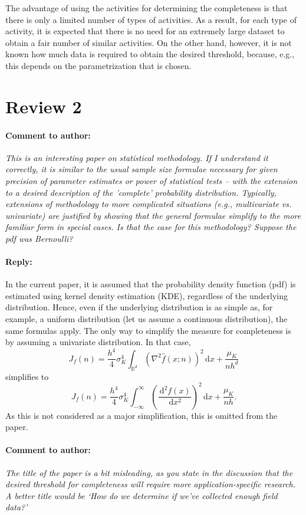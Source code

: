 \documentclass[10pt,final,a4paper,oneside,onecolumn]{article}
\newcommand{\measure}[2]{J_{#1} \left( #2 \right)}
\newcommand*{\ud}{\mathrm{\,d}}
\newcommand{\toauthor}{\paragraph*{Comment to author:} \itshape}
\newcommand{\fromauthor}{\paragraph*{Reply:} \normalfont}
\newcommand{\cstart}{\cbstart\color{red}}
\newcommand{\cend}{\cbend\color{black}}
\begin{document}
\cstart 
The advantage of using the activities for determining the completeness is that there is only a limited number of types of activities. As a result, for each type of activity, it is expected that there is no need for an extremely large dataset to obtain a fair number of similar activities. On the other hand, however, it is not known how much data is required to obtain the desired threshold, because, e.g., this depends on the parametrization that is chosen. 
\cend 

\section*{Review 2}

\toauthor This is an interesting paper on statistical methodology. If I understand it correctly, it is similar to the usual sample size formulae necessary for given precision of parameter estimates or power of statistical tests -- with the extension to a desired description of the 'complete' probability distribution. Typically, extensions of methodology to more complicated situations (e.g., multivariate vs. univariate) are justified by showing that the general formulae simplify to the more familiar form in special cases. Is that the case for this methodology? Suppose the pdf was Bernoulli? 

\fromauthor In the current paper, it is assumed that the probability density function (pdf) is estimated using kernel density estimation (KDE), regardless of the underlying distribution. Hence, even if the underlying distribution is as simple as, for example, a uniform distribution (let us assume a continuous distribution), the same formulas apply. The only way to simplify the measure for completeness is by assuming a univariate distribution. In that case, 
\begin{equation}
	\measure{f}{n} = \frac{h^4}{4} \sigma_K^4 \int_{\mathbb{R}^d} \left( \nabla^2 \hat{f}(x;n) \right)^2 \ud x + \frac{\mu_K}{nh^d}
\end{equation}
simplifies to
\begin{equation}
	\measure{f}{n} = \frac{h^4}{4} \sigma_K^4 \int_{-\infty}^{\infty} \left( \frac{\ud^2 f(x)}{\ud x^2} \right)^2 \ud x + \frac{\mu_K}{nh}.
\end{equation}
As this is not considered as a major simplification, this is omitted from the paper.

\toauthor The title of the paper is a bit misleading, as you state in the discussion that the desired threshold for completeness will require more application-specific research. A better title would be `How do we determine if we've collected enough field data?'
\end{document}
